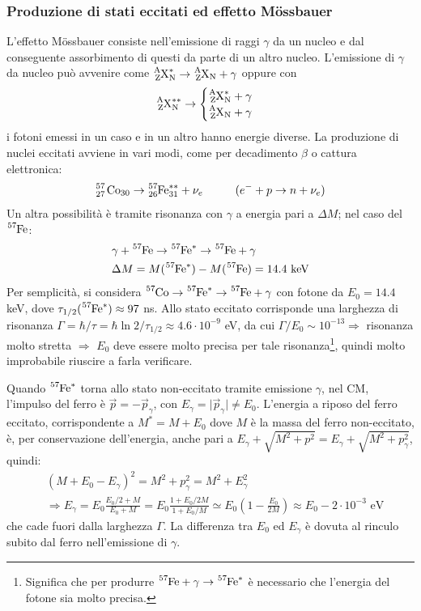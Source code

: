 \documentclass[10pt, a4paper]{scrartcl}
\numberwithin{equation}{subsection}
\theoremstyle{style1}
\begin{document}
\subsubsection{Produzione di stati eccitati ed effetto M\"ossbauer}
L'effetto M\"ossbauer consiste nell'emissione di raggi $\gamma$ da un nucleo e dal conseguente assorbimento di questi da parte di un altro nucleo. L'emissione di $\gamma$ da nucleo pu\`o avvenire come $\ce{_Z^AX^*_N} \to \ce{_Z^AX_N} + \gamma $ oppure con
\[
	\ce{_Z^AX^{**}_N} \to  \begin{cases}
		\ce{_Z^AX^*_N} + \gamma\\
		\ce{_Z^AX_N} + \gamma
	\end{cases}	
\] 
i fotoni emessi in un caso e in un altro hanno energie diverse. La produzione di nuclei eccitati avviene in vari modi, come per decadimento $\beta $ o cattura elettronica:
\[
	\ce{_{27}^{57} Co_{30} } \to \ce{_{26}^{57}Fe^{**}_{31}} + \nu _e \hspace{1cm} (e^- + p \to  n + \nu _e)
\] 
Un altra possibilit\`a \`e tramite risonanza con $\gamma$ a energia pari a $\Delta M$; nel caso del $\ce{^{57}Fe}$:
\[
\begin{split}
	& \gamma + \ce{^{57}Fe} \to  \ce{^{57}Fe^*} \to \ce{^{57}Fe} + \gamma\\
	&\Delta M = M(\ce{^{57}Fe^*}) - M(\ce{^{57}Fe}) = 14.4 \text{ keV}
\end{split}
\] 
Per semplicit\`a, si considera $\ce{^{57}Co}\to \ce{^{57}Fe^*}\to \ce{^{57}Fe} + \gamma$ con fotone da $E_0=14.4$ keV, dove $\tau _{1/2}(\ce{^{57}Fe^*}) \approx 97$ ns. Allo stato eccitato corrisponde una larghezza di risonanza $\Gamma = \hbar  / \tau = \hbar  \ln 2 / \tau _{1 / 2} \approx 4.6 \cdot  10^{-9} $ eV, da cui $\Gamma / E_0 \sim 10^{-13} \Rightarrow $ risonanza molto stretta $\Rightarrow $ $E_0$ deve essere molto precisa per tale risonanza\footnote{Significa che per produrre $\ce{^{57}Fe} + \gamma \to \ce{^{57}Fe^*} $ \`e necessario che l'energia del fotone sia molto precisa.}, quindi molto improbabile riuscire a farla verificare.

Quando $\ce{^{57}Fe^*}$ torna allo stato non-eccitato tramite emissione $\gamma$, nel CM, l'impulso del ferro \`e $\vec{p} = - \vec{p}_\gamma$, con $E_\gamma = \lvert \vec{p}_\gamma \rvert \neq E_0$. L'energia a riposo del ferro eccitato, corrispondente a $M^* = M + E_0$ dove $M$ \`e la massa del ferro non-eccitato, \`e, per conservazione dell'energia, anche pari a $E_\gamma +\sqrt{M^2 + p^2} = E_\gamma + \sqrt{M^2 + p_\gamma^2} $, quindi:
\[
\begin{split}
	&(M+E_0-E_\gamma)^2 = M^2 + p_\gamma^2 =M^2 + E_\gamma^2\\
	&\Rightarrow E_\gamma = E_0 \frac{E_0 / 2 + M}{E_0 + M} = E_0 \frac{1 + E_0 / 2M}{1+ E_0 / M} \simeq E_0 \left(1 - \frac{E_0}{2M}\right) \approx E_0 - 2 \cdot  10^{-3} \text{ eV}
\end{split}
\] 
che cade fuori dalla larghezza $\Gamma$. La differenza tra $E_0$ ed $E_\gamma$ \`e dovuta al rinculo subito dal ferro nell'emissione di $\gamma$. 
\end{document}
